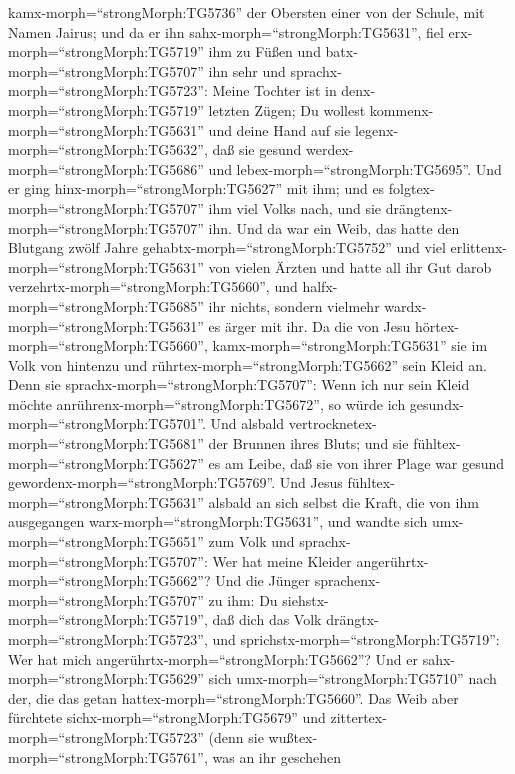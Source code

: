 kamx-morph=``strongMorph:TG5736'' der Obersten einer von der Schule, mit
Namen Jairus; und da er ihn sahx-morph=``strongMorph:TG5631'', fiel
erx-morph=``strongMorph:TG5719'' ihm zu Füßen  und
batx-morph=``strongMorph:TG5707'' ihn sehr und
sprachx-morph=``strongMorph:TG5723'': Meine Tochter ist in
denx-morph=``strongMorph:TG5719'' letzten Zügen; Du wollest
kommenx-morph=``strongMorph:TG5631'' und deine Hand auf sie
legenx-morph=``strongMorph:TG5632'', daß sie gesund
werdex-morph=``strongMorph:TG5686'' und
lebex-morph=``strongMorph:TG5695''.  Und er ging
hinx-morph=``strongMorph:TG5627'' mit ihm; und es
folgtex-morph=``strongMorph:TG5707'' ihm viel Volks nach, und sie
drängtenx-morph=``strongMorph:TG5707'' ihn.  Und da war ein
Weib, das hatte den Blutgang zwölf Jahre
gehabtx-morph=``strongMorph:TG5752''  und viel
erlittenx-morph=``strongMorph:TG5631'' von vielen Ärzten und hatte all
ihr Gut darob verzehrtx-morph=``strongMorph:TG5660'', und
halfx-morph=``strongMorph:TG5685'' ihr nichts, sondern vielmehr
wardx-morph=``strongMorph:TG5631'' es ärger mit ihr.  Da
die von Jesu hörtex-morph=``strongMorph:TG5660'',
kamx-morph=``strongMorph:TG5631'' sie im Volk von hintenzu und
rührtex-morph=``strongMorph:TG5662'' sein Kleid an.  Denn
sie sprachx-morph=``strongMorph:TG5707'': Wenn ich nur sein Kleid möchte
anrührenx-morph=``strongMorph:TG5672'', so würde ich
gesundx-morph=``strongMorph:TG5701''.  Und alsbald
vertrocknetex-morph=``strongMorph:TG5681'' der Brunnen ihres Bluts; und
sie fühltex-morph=``strongMorph:TG5627'' es am Leibe, daß sie von ihrer
Plage war gesund gewordenx-morph=``strongMorph:TG5769''. 
Und Jesus fühltex-morph=``strongMorph:TG5631'' alsbald an sich selbst
die Kraft, die von ihm ausgegangen warx-morph=``strongMorph:TG5631'',
und wandte sich umx-morph=``strongMorph:TG5651'' zum Volk und
sprachx-morph=``strongMorph:TG5707'': Wer hat meine Kleider
angerührtx-morph=``strongMorph:TG5662''?  Und die Jünger
sprachenx-morph=``strongMorph:TG5707'' zu ihm: Du
siehstx-morph=``strongMorph:TG5719'', daß dich das Volk
drängtx-morph=``strongMorph:TG5723'', und
sprichstx-morph=``strongMorph:TG5719'': Wer hat mich
angerührtx-morph=``strongMorph:TG5662''?  Und er
sahx-morph=``strongMorph:TG5629'' sich umx-morph=``strongMorph:TG5710''
nach der, die das getan hattex-morph=``strongMorph:TG5660''.
 Das Weib aber fürchtete sichx-morph=``strongMorph:TG5679''
und zittertex-morph=``strongMorph:TG5723'' (denn sie
wußtex-morph=``strongMorph:TG5761'', was an ihr geschehen
